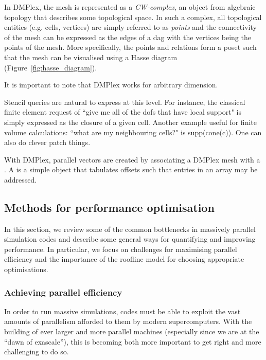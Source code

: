 
In DMPlex, the mesh is represented as a \textit{CW-complex}, an object from algebraic topology that describes some topological space.
In such a complex, all topological entities (e.g. cells, vertices) are simply referred to as \textit{points} and the connectivity of the mesh can be expressed as the edges of a \gls{dag} with the vertices being the points of the mesh.
More specifically, the points and relations form a \gls{poset} such that the mesh can be visualised using a Hasse diagram (Figure~\ref{fig:hasse_diagram}).

It is important to note that DMPlex works for arbitrary dimension.


Stencil queries are natural to express at this level.
For instance, the classical finite element request of ``give me all of the \glspl{dof} that have local support" is simply expressed as the closure of a given cell.
Another example useful for finite volume calculations: ``what are my neighbouring cells?" is supp(cone(c)).
One can also do clever patch things.

With DMPlex, parallel vectors are created by associating a DMPlex mesh with a .
A  is a simple object that tabulates offsets such that entries in an array may be addressed.

\subsection{Methods for performance optimisation}

In this section, we review some of the common bottlenecks in massively parallel simulation codes and describe some general ways for quantifying and improving performance.
In particular, we focus on challenges for maximising parallel efficiency and the importance of the roofline model for choosing appropriate optimisations.

\subsubsection{Achieving parallel efficiency}
\label{sec:background_perf_efficiency}

In order to run massive simulations, codes must be able to exploit the vast amounts of parallelism afforded to them by modern supercomputers.
With the building of ever larger and more parallel machines (especially since we are at the ``dawn of exascale''), this is becoming both more important to get right and more challenging to do so.

